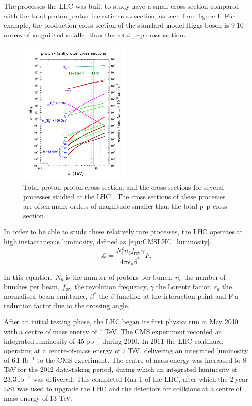 The processes the \ac{LHC} was built to study have a small cross-section
compared with the total proton-proton inelastic cross-section, as seen from figure
\ref{fig:stirling_xs}. For example, the production cross-section of the
standard model Higgs boson is 9-10 orders of magniuted smaller than the total p--p cross section.

\begin{figure}[h!]
\includegraphics[width=0.5\textwidth]{./Detector/Plots/crosssections2013.jpg}
\caption{Total proton-proton cross section, and the cross-sections
for several processes studied at the LHC \cite{stirling-crosssection}.
The cross sections of these processes
are often many orders of magnitude smaller than the total p--p cross section.}
\label{fig:stirling_xs}
\end{figure}

In order to be able to study these relatively rare processes, 
the LHC operates at high instantaneous luminosity, defined as
\ref{eqn:CMSLHC_luminosity}. 
\begin{equation}\label{eqn:CMSLHC_luminosity}
\mathcal{L} = \frac{N_b^2n_bf_{\text{rev}}\gamma}{4\pi\epsilon_n\beta^{*}}F.
\end{equation}

In this equation, $N_b$ is the number of protons per bunch, $n_b$ the number of
bunches per beam, $f_{\text{rev}}$ the revolution frequency, $\gamma$ the 
Lorentz factor, $\epsilon_n$ the normalised beam
emittance, $\beta^{*}$ the $\beta$-function at the interaction point and F a reduction
factor due to the crossing angle. 

After an initial testing phase, the \ac{LHC} began its first physics run in May 2010 with 
a centre of mass energy of 7 TeV. The CMS experiment recorded an integrated luminosity of 45 pb$^{-1}$
during 2010. In 2011 the \ac{LHC} continued operating at a centre-of-mass energy of 7 TeV, delivering an integrated 
luminosity of 6.1 fb$^{-1}$ to the CMS experiment. The centre of mass energy was increased to 8 TeV
for the 2012 data-taking period, during which an integrated luminosity of 23.3 fb$^{-1}$ was delivered.
This completed Run 1 of the \ac{LHC}, after which the 2-year \ac{LS1} was used to 
upgrade the LHC and the detectors for collisions at a centre of mass energy of 13 TeV.


